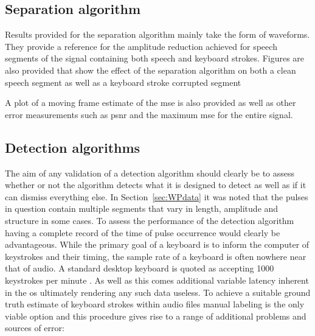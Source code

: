 \subsection{Separation algorithm}
Results provided for the separation algorithm mainly take the form of waveforms. They provide a reference for the amplitude reduction achieved for speech segments of the signal containing both speech and keyboard strokes. Figures are also provided that show the effect of the separation algorithm on both a clean speech segment as well as a keyboard stroke corrupted segment \DIFdelbegin {}\DIFdelend \DIFaddbegin {}\DIFaddend 

A plot of a moving frame estimate of the \DIFdelbegin {}\DIFdelend \DIFaddbegin \gls{mse} \DIFaddend is also provided \DIFaddbegin {}\DIFaddend as well as other error measurements such as \DIFdelbegin {}\DIFdelend \DIFaddbegin \gls{psnr} \DIFaddend and the maximum \DIFdelbegin {}\DIFdelend \DIFaddbegin \gls{mse} \DIFaddend for the entire signal.

\subsection{Detection algorithms}
The aim of any validation of a detection algorithm should clearly be to assess whether or not the algorithm detects what it is designed to detect as well as if it can dismiss everything else. In Section~\ref{sec:WPdata} it was noted that the pulses in question contain multiple segments that vary in length, amplitude and structure in some cases. To assess the performance of the detection algorithm having a complete record of the time of pulse occurrence would clearly be advantageous. While the primary goal of a keyboard is to inform the computer of keystrokes and their timing, the sample rate of a keyboard is often nowhere near that of audio. A standard desktop keyboard is quoted as accepting 1000 keystrokes per minute \cite{MSCurveKeyboard3000}. As well as this comes additional variable latency inherent in the \DIFdelbegin {}\DIFdelend \DIFaddbegin \gls{os} \DIFaddend ultimately rendering any such data useless. To achieve a suitable ground truth estimate of keyboard strokes within audio files manual labeling is the only viable option and this procedure gives rise to a range of additional problems and sources of error:

